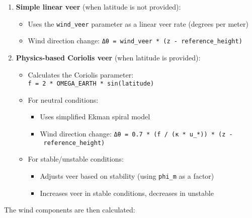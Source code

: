 \documentclass{article}
\begin{document}
\begin{enumerate}[label=\arabic*.]
\item
  \textbf{Simple linear veer} (when latitude is not provided):

  \begin{itemize}[label=\textbullet]
  \item
    Uses the \texttt{wind\_veer} parameter as a linear veer rate
    (degrees per meter)
  \item
    Wind direction change:
    \texttt{Δθ\ =\ wind\_veer\ *\ (z\ -\ reference\_height)}
  \end{itemize}
\item
  \textbf{Physics-based Coriolis veer} (when latitude is provided):

  \begin{itemize}[label=\textbullet]
  \item
    Calculates the Coriolis parameter:
    \texttt{f\ =\ 2\ *\ OMEGA\_EARTH\ *\ sin(latitude)}
  \item
    For neutral conditions:

    \begin{itemize}[label=\textbullet]
    \item
      Uses simplified Ekman spiral model
    \item
      Wind direction change:
      \texttt{Δθ\ =\ 0.7\ *\ (f\ /\ (κ\ *\ u\_*))\ *\ (z\ -\ reference\_height)}
    \end{itemize}
  \item
    For stable/unstable conditions:

    \begin{itemize}[label=\textbullet]
    \item
      Adjusts veer based on stability (using \texttt{phi\_m} as a
      factor)
    \item
      Increases veer in stable conditions, decreases in unstable
    \end{itemize}
  \end{itemize}
\end{enumerate}

The wind components are then calculated:

\begin{Shaded}
\begin{Highlighting}[]
\OperatorTok{=}\OperatorTok{*}
\OperatorTok{=}\OperatorTok{*}
\end{Highlighting}
\end{Shaded}
\end{document}

